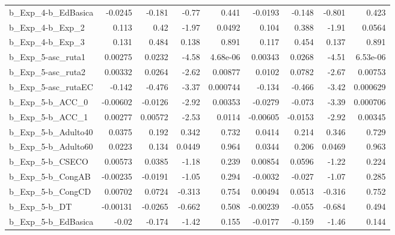\begin{tabular}{lrrrrrrrr}
b\_Exp\_4-b\_EdBasica         &     -0.0245 &       -0.181 &    -0.77 &    0.441 &    -0.0193 &      -0.148 &       -0.801 &         0.423 \\
b\_Exp\_4-b\_Exp\_2            &       0.113 &         0.42 &    -1.97 &   0.0492 &      0.104 &       0.388 &        -1.91 &        0.0564 \\
b\_Exp\_4-b\_Exp\_3            &       0.131 &        0.484 &    0.138 &    0.891 &      0.117 &       0.454 &        0.137 &         0.891 \\
b\_Exp\_5-asc\_ruta1          &     0.00275 &       0.0232 &    -4.58 & 4.68e-06 &    0.00343 &      0.0268 &        -4.51 &      6.53e-06 \\
b\_Exp\_5-asc\_ruta2          &     0.00332 &       0.0264 &    -2.62 &  0.00877 &     0.0102 &      0.0782 &        -2.67 &       0.00753 \\
b\_Exp\_5-asc\_rutaEC         &      -0.142 &       -0.476 &    -3.37 & 0.000744 &     -0.134 &      -0.466 &        -3.42 &      0.000629 \\
b\_Exp\_5-b\_ACC\_0            &    -0.00602 &      -0.0126 &    -2.92 &  0.00353 &    -0.0279 &      -0.073 &        -3.39 &      0.000706 \\
b\_Exp\_5-b\_ACC\_1            &     0.00277 &      0.00572 &    -2.53 &   0.0114 &   -0.00605 &     -0.0153 &        -2.92 &       0.00345 \\
b\_Exp\_5-b\_Adulto40         &      0.0375 &        0.192 &    0.342 &    0.732 &     0.0414 &       0.214 &        0.346 &         0.729 \\
b\_Exp\_5-b\_Adulto60         &      0.0223 &        0.134 &   0.0449 &    0.964 &     0.0344 &       0.206 &       0.0469 &         0.963 \\
b\_Exp\_5-b\_CSECO            &     0.00573 &       0.0385 &    -1.18 &    0.239 &    0.00854 &      0.0596 &        -1.22 &         0.224 \\
b\_Exp\_5-b\_CongAB           &    -0.00235 &      -0.0191 &    -1.05 &    0.294 &    -0.0032 &      -0.027 &        -1.07 &         0.285 \\
b\_Exp\_5-b\_CongCD           &     0.00702 &       0.0724 &   -0.313 &    0.754 &    0.00494 &      0.0513 &       -0.316 &         0.752 \\
b\_Exp\_5-b\_DT               &    -0.00131 &      -0.0265 &   -0.662 &    0.508 &   -0.00239 &      -0.055 &       -0.684 &         0.494 \\
b\_Exp\_5-b\_EdBasica         &       -0.02 &       -0.174 &    -1.42 &    0.155 &    -0.0177 &      -0.159 &        -1.46 &         0.144 \\

\end{tabular}
